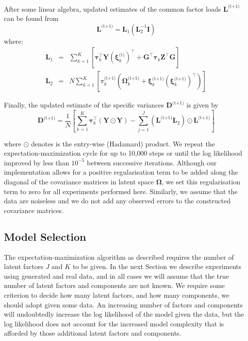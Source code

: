 \documentclass[twocolumn]{aastex62}
\newcommand{\vect}[1]{\boldsymbol{\mathbf{#1}}}
\renewcommand{\vec}[1]{\vect{#1}}
\newcommand{\weight}{\pi}
\newcommand{\data}{\textbf{Y}}
\newcommand{\vecdata}{\vec\data}
\newcommand{\nextstep}{^\textrm{(t+1)}}
\newcommand{\thisstep}{^\textrm{(t)}}
\newcommand{\transpose}{^\intercal}
\newcommand{\eye}{\textbf{I}}
\newcommand{\factorloads}{\textbf{L}}
\newcommand{\specificvariance}{\vec{D}}
\newcommand{\scoremeans}{\vec\xi}
\newcommand{\scorecovs}{\vec\Omega}
\newcommand{\NumData}{N}
\newcommand{\NumLatentFactors}{J}
\newcommand{\NumComponents}{K}
\newcommand{\numcomponents}{k}
\begin{document}
After some linear algebra, updated estimates of the common factor loads $\factorloads\nextstep$
can be found from
\begin{equation}
	\factorloads\nextstep = \factorloads_{1}\left(\factorloads_{2}^{-1}\eye\right)
\end{equation}
\noindent{}where:
\begin{eqnarray}
	\factorloads_1 &=& \sum_{\numcomponents=1}^{\NumComponents}\left[ \vec\tau_\numcomponents\transpose\vecdata\left(\scoremeans_\numcomponents\thisstep\right)\transpose + 
	\vec{G}\transpose\vec\tau_\numcomponents\vec{Z}\transpose\vec{G}\right] \\
	\factorloads_2 &=& N\sum_{\numcomponents=1}^{\NumComponents}\left[\weight_\numcomponents\nextstep\left(\scorecovs_\numcomponents\nextstep + \scoremeans_\numcomponents\nextstep\left(\scoremeans_\numcomponents\nextstep\right)\transpose\right)\right]
\end{eqnarray}


Finally, the updated estimate of the specific variances $\specificvariance\nextstep$ is given
by
\begin{equation}
	\specificvariance\nextstep = \frac{1}{\NumData}\left[\sum^{\NumComponents}_{\numcomponents=1}\vec\tau_\numcomponents\transpose\left(\vecdata\odot\vecdata\right) - \sum_{j=1}^{J}\left(\factorloads\nextstep\factorloads_2\right)\odot\factorloads\nextstep\right]
\end{equation}

\noindent{}where $\odot$ denotes is the entry-wise (Hadamard) product. We repeat
the expectation-maximization cycle for up to 10,000 steps or until the log likelihood
improved by less than $10^{-5}$ between successive iterations. Although our implementation
allows for a positive regularisation term to be added along the diagonal of the covariance
matrices in latent space $\scorecovs$, we set this regularisation term to zero for all
experiments performed here. Similarly, we assume that the data are noiseless and we do
not add any observed errors to the constructed covariance matrices.




\subsection{Model Selection}

The expectation-maximization algorithm as described requires the number of latent
factors $\NumLatentFactors$ and $\NumComponents$ to be given. In the next Section
we describe experiments using generated and real data, and in all cases we will
assume that the true number of latent factors and components are not known. 
We require some criterion to decide how many latent factors, and how many
components, we should adopt given some data. An increasing number of factors
and components will undoubtedly increase the log likelihood of the model given
the data, but the log likelihood does not account for the increased model 
complexity that is afforded by those additional latent factors and components.
\end{document}
